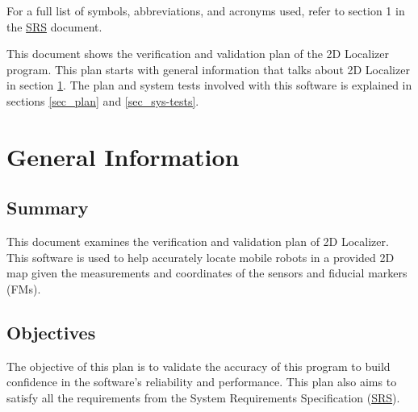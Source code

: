\documentclass[12pt, titlepage]{article}
\begin{document}
For a full list of symbols, abbreviations, and acronyms used, refer to section 1 in the \href{https://github.com/AliyahJimoh/2D-Localizer/blob/main/docs/SRS/SRS.pdf}{SRS} document.

\newpage


This document shows the verification and validation plan of the 2D Localizer program. This plan starts with general information that talks about 2D Localizer in section \ref{sec_general}. The plan and system tests involved with this software is explained in sections \ref{sec_plan} and \ref{sec_sys-tests}.



\section{General Information}\label{sec_general}

\subsection{Summary}

This document examines the verification and validation plan of 2D Localizer. This software is used to help accurately locate mobile robots in a provided 2D map given the measurements and coordinates of the sensors and fiducial markers (FMs).

\subsection{Objectives}

The objective of this plan is to validate the accuracy of this program to build confidence in the software's reliability and performance. This plan also aims to satisfy all the requirements from the System Requirements Specification (\href{https://github.com/AliyahJimoh/2D-Localizer/blob/main/docs/SRS/SRS.pdf}{SRS}).  


\end{document}
